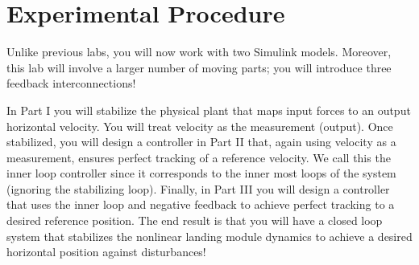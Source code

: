 \section{Experimental Procedure}\label{Lab:3:Experiment}
Unlike previous labs, you will now work with two Simulink models.
Moreover, this lab will involve a larger number of moving parts;
you will introduce three feedback interconnections!

In Part I you will stabilize the physical plant that maps input forces to an output horizontal velocity.
You will treat velocity as the measurement (output).
Once stabilized, you will design a controller in Part II that, again using velocity as a measurement, ensures perfect tracking of a reference velocity.
We call this the inner loop controller since it corresponds to the inner most loops of the system (ignoring the stabilizing loop).
Finally, in Part III you will design a controller that uses the inner loop and negative feedback to achieve perfect tracking to a desired reference position.
The end result is that you will have a closed loop system that stabilizes the nonlinear landing module dynamics to achieve a desired horizontal position against disturbances!

